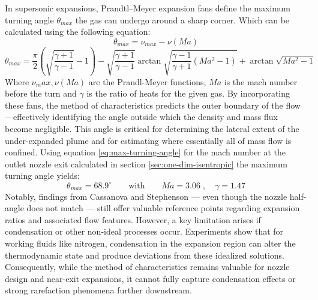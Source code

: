 		In supersonic expansions, Prandtl–Meyer expansion fans define the maximum turning angle $\theta_{max}$ the gas can undergo around a sharp corner.
		Which can be calculated using the following equation:
		\begin{equation*}
			\theta_{max} = \nu_{max} - \nu(Ma)
		\end{equation*}
		\begin{equation}
			\theta_{max} = \frac{\pi}{2} \left(\sqrt{\frac{\gamma + 1}{\gamma - 1}} - 1\right) - \sqrt{\frac{\gamma + 1}{\gamma - 1}}\arctan{\sqrt{\frac{\gamma - 1}{\gamma + 1}(Ma^2 - 1)}} + \arctan{\sqrt{Ma^2 -1}}
			\label{eq:max-turning-angle}
		\end{equation}
		Where $\nu_max,\nu(Ma)$ are the Prandl-Meyer functions, $Ma$ is the mach number before the turn and $\gamma$ is the ratio of heats for the given gas.
		By incorporating these fans, the method of characteristics predicts the outer boundary of the flow—effectively identifying the angle outside which the density and mass flux become negligible.
		This angle is critical for determining the lateral extent of the under-expanded plume and for estimating where essentially all of mass flow is confined.
		Using equation \eqref{eq:max-turning-angle} for the mach number at the outlet nozzle exit calculated in section \ref{sec:one-dim-isentropic} the maximum turning angle yields:
		$$
			\theta_{max} = 68.9^\circ
			\qquad \text{with} \qquad
			Ma = 3.06\;,\quad \gamma = 1.47
		$$
		Notably, findings from Cassanova and Stephenson \cite{Cassanova1965} — even though the nozzle half-angle does not match — still offer valuable reference points regarding expansion ratios and associated flow features.
		However, a key limitation arises if condensation or other non-ideal processes occur.
		Experiments show that for working fluids like nitrogen, condensation in the expansion region can alter the thermodynamic state and produce deviations from these idealized solutions.
		Consequently, while the method of characteristics remains valuable for nozzle design and near-exit expansions, it cannot fully capture condensation effects or strong rarefaction phenomena further downstream.
		\cite{jousten_handbook_2016, robertson_investigation_1970, noauthor_zucrow_nodate}

